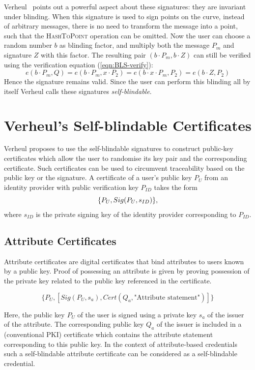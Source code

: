 Verheul~\cite{Verheul01} points out a powerful aspect about these signatures:
they are invariant under blinding. When this signature is used to sign points on
the curve,  instead of arbitrary messages, there is no need to transform the
message into a point, such that the \textsc{HashToPoint} operation can be
omitted. Now the user can choose a random number $b$ as blinding factor, and
multiply both the message $P_m$ and signature $Z$ with this factor. The
resulting pair $(b \cdot P_m, b \cdot Z)$ can still be verified using the
verification equation (\ref{eqn:BLS-verify}):
\begin{equation*}
  e(b \cdot P_m, Q)
  = e(b \cdot P_m, x \cdot P_2)
  = e(b \cdot x \cdot P_m, P_2)
  = e(b \cdot Z, P_2)
\end{equation*}
Hence the signature remains valid. Since the user can perform this blinding all
by itself Verheul calls these signatures \emph{self-blindable}.

\section{Verheul's Self-blindable Certificates}

Verheul proposes to use the self-blindable signatures to construct public-key
certificates which allow the user to randomise its key pair and the
corresponding certificate. Such certificates can be used to circumvent
traceability based on the public key or the signature. A certificate of a user's
public key $P_U$ from an identity provider with public verification key $P_{ID}$
takes the form
\begin{equation*}
  \{ P_U, Sig(P_U, s_{ID}) \}\text,
\end{equation*}
where $s_{ID}$ is the private signing key of the identity provider corresponding
to $P_{ID}$.

\subsection{Attribute Certificates}

Attribute certificates are digital certificates that bind attributes to users
known by a public key. Proof of possessing an attribute is given by proving
possession of the private key related to the public key referenced in the
certificate.

$$\{P_U, [Sig(P_U, s_a), Cert(Q_a, \text{"Attribute statement"})]\}$$

Here, the public key $P_U$ of the user is signed using a private key $s_a$ of
the issuer of the attribute. The corresponding public key $Q_a$ of the issuer is
included in a (conventional PKI) certificate which contains the attribute
statement corresponding to this public key. In the context of attribute-based
credentials such a self-blindable attribute certificate can be considered as a
self-blindable credential.


